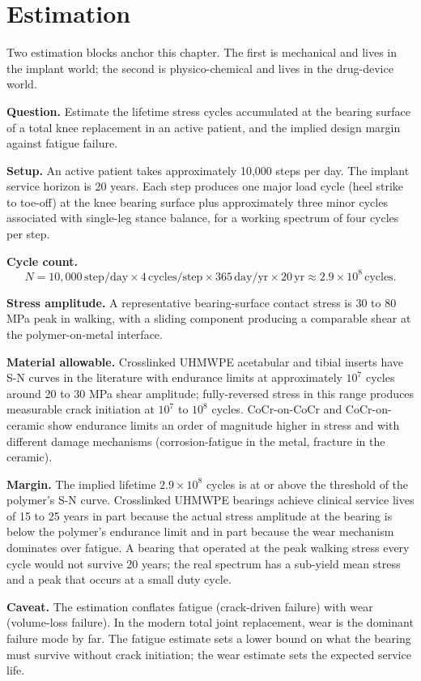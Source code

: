 \section{Estimation}

Two estimation blocks anchor this chapter. The first is mechanical
and lives in the implant world; the second is physico-chemical and
lives in the drug-device world.

\begin{estimation}
\textbf{Question.} Estimate the lifetime stress cycles accumulated
at the bearing surface of a total knee replacement in an active
patient, and the implied design margin against fatigue failure.

\textbf{Setup.} An active patient takes approximately 10{,}000
steps per day. The implant service horizon is 20 years. Each step
produces one major load cycle (heel strike to toe-off) at the
knee bearing surface plus approximately three minor cycles
associated with single-leg stance balance, for a working spectrum
of four cycles per step.

\textbf{Cycle count.}
\[
N = 10{,}000 \,\text{step}/\text{day}
\times 4 \,\text{cycles}/\text{step}
\times 365 \,\text{day}/\text{yr}
\times 20 \,\text{yr}
\approx 2.9 \times 10^8 \,\text{cycles}.
\]

\textbf{Stress amplitude.} A representative bearing-surface contact
stress is 30 to 80 MPa peak in walking, with a sliding component
producing a comparable shear at the polymer-on-metal interface.

\textbf{Material allowable.} Crosslinked UHMWPE acetabular and
tibial inserts have S-N curves in the literature with endurance
limits at approximately $10^7$ cycles around 20 to 30 MPa shear
amplitude; fully-reversed stress in this range produces measurable
crack initiation at $10^7$ to $10^8$ cycles. CoCr-on-CoCr and
CoCr-on-ceramic show endurance limits an order of magnitude higher
in stress and with different damage mechanisms (corrosion-fatigue
in the metal, fracture in the ceramic).

\textbf{Margin.} The implied lifetime $2.9 \times 10^8$ cycles is
at or above the threshold of the polymer's S-N curve. Crosslinked
UHMWPE bearings achieve clinical service lives of 15 to 25 years
in part because the actual stress amplitude at the bearing is
below the polymer's endurance limit and in part because the wear
mechanism dominates over fatigue. A bearing that operated at the
peak walking stress every cycle would not survive 20 years; the
real spectrum has a sub-yield mean stress and a peak that occurs
at a small duty cycle.

\textbf{Caveat.} The estimation conflates fatigue (crack-driven
failure) with wear (volume-loss failure). In the modern total
joint replacement, wear is the dominant failure mode by far. The
fatigue estimate sets a lower bound on what the bearing must
survive without crack initiation; the wear estimate sets the
expected service life.
\end{estimation}

